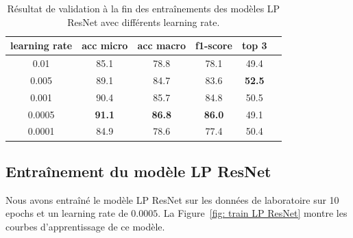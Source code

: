 \documentclass[a4paper]{article}
\begin{document}
\begin{table}[ht]
    \centering
    \begin{tabular}{cccccc}
    \toprule
    learning rate & acc micro & acc macro & f1-score & top 3 \\
    \midrule
    0.01 & 85.1 & 78.8 & 78.1 & 49.4 \\
    0.005 & 89.1 & 84.7 & 83.6 & \textbf{52.5} \\
    0.001 & 90.4 & 85.7 & 84.8 & 50.5 \\
    0.0005 & \textbf{91.1} & \textbf{86.8} & \textbf{86.0} & 49.1 \\
    0.0001 & 84.9 & 78.6 & 77.4 & 50.4 \\
    \bottomrule
    \end{tabular}
    \caption{Résultat de validation à la fin des entraînements des modèles LP ResNet avec différents learning rate.}
    \label{tab:gridsearch}
\end{table}

\subsection{Entraînement du modèle LP ResNet}
Nous avons entraîné le modèle LP ResNet sur les données de laboratoire sur 10 epochs et un learning rate de $0.0005$. La Figure~\ref{fig: train LP ResNet} montre les courbes d'apprentissage de ce modèle.
\end{document}

